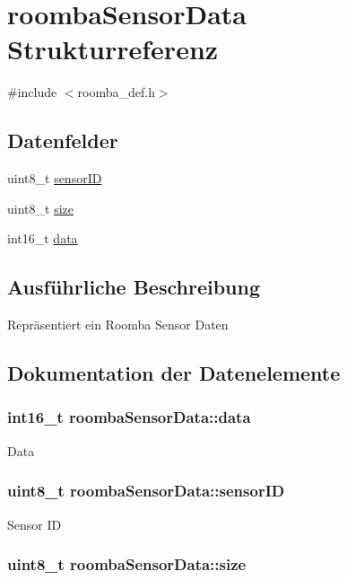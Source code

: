 \hypertarget{structroombaSensorData}{\section{roomba\-Sensor\-Data Strukturreferenz}
\label{structroombaSensorData}
}


{\ttfamily \#include $<$roomba\-\_\-def.\-h$>$}

\subsection*{Datenfelder}
\begin{DoxyCompactItemize}
\item 
uint8\-\_\-t \hyperlink{structroombaSensorData_acf69bf33685ebd7a21e8e22e2bb050ad}{sensor\-I\-D}
\item 
uint8\-\_\-t \hyperlink{structroombaSensorData_a8a2f39faae9b01bf5b9df2e78e7d60c9}{size}
\item 
int16\-\_\-t \hyperlink{structroombaSensorData_a0c1e2bfed2c054983f211461a1a02594}{data}
\end{DoxyCompactItemize}


\subsection{Ausführliche Beschreibung}
Repräsentiert ein Roomba Sensor Daten 

\subsection{Dokumentation der Datenelemente}
\hypertarget{structroombaSensorData_a0c1e2bfed2c054983f211461a1a02594}{
\subsubsection[{data}]{\setlength{\rightskip}{0pt plus 5cm}int16\-\_\-t roomba\-Sensor\-Data\-::data}}\label{structroombaSensorData_a0c1e2bfed2c054983f211461a1a02594}
Data \hypertarget{structroombaSensorData_acf69bf33685ebd7a21e8e22e2bb050ad}{
\subsubsection[{sensor\-I\-D}]{\setlength{\rightskip}{0pt plus 5cm}uint8\-\_\-t roomba\-Sensor\-Data\-::sensor\-I\-D}}\label{structroombaSensorData_acf69bf33685ebd7a21e8e22e2bb050ad}
Sensor I\-D \hypertarget{structroombaSensorData_a8a2f39faae9b01bf5b9df2e78e7d60c9}{
\subsubsection[{size}]{\setlength{\rightskip}{0pt plus 5cm}uint8\-\_\-t roomba\-Sensor\-Data\-::size}}\label{structroombaSensorData_a8a2f39faae9b01bf5b9df2e78e7d60c9}


